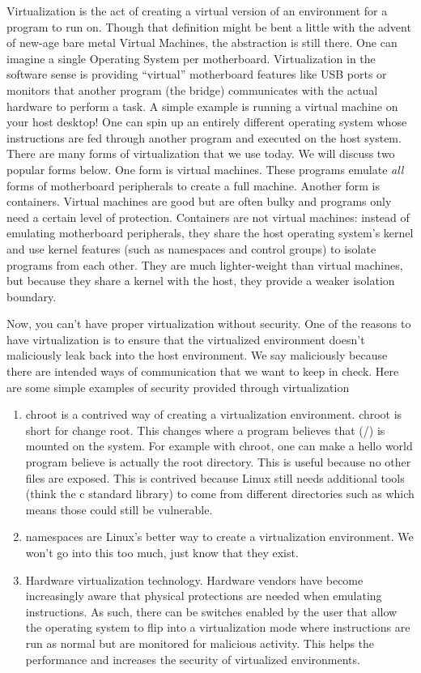 Virtualization is the act of creating a virtual version of an environment for a program to run on.
Though that definition might be bent a little with the advent of new-age bare metal Virtual Machines, the abstraction is still there.
One can imagine a single Operating System per motherboard.
Virtualization in the software sense is providing ``virtual'' motherboard features like USB ports or monitors that another program (the bridge) communicates with the actual hardware to perform a task.
A simple example is running a virtual machine on your host desktop!
One can spin up an entirely different operating system whose instructions are fed through another program and executed on the host system.
There are many forms of virtualization that we use today. We will discuss two popular forms below.
One form is virtual machines.
These programs emulate \textit{all} forms of motherboard peripherals to create a full machine.
Another form is containers.
Virtual machines are good but are often bulky and programs only need a certain level of protection.
Containers are not virtual machines: instead of emulating motherboard peripherals, they share the host operating system's kernel and use kernel features (such as namespaces and control groups) to isolate programs from each other. They are much lighter-weight than virtual machines, but because they share a kernel with the host, they provide a weaker isolation boundary.

Now, you can't have proper virtualization without security.
One of the reasons to have virtualization is to ensure that the virtualized environment doesn't maliciously leak back into the host environment.
We say maliciously because there are intended ways of communication that we want to keep in check.
Here are some simple examples of security provided through virtualization

\begin{enumerate}
\item chroot is a contrived way of creating a virtualization environment.
  chroot is short for change root.
  This changes where a program believes that (/) is mounted on the system.
  For example with chroot, one can make a hello world program believe  is actually the root directory.
  This is useful because no other files are exposed.
  This is contrived because Linux still needs additional tools (think the c standard library) to come from different directories such as  which means those could still be vulnerable.
\item namespaces are Linux's better way to create a virtualization environment.
  We won't go into this too much, just know that they exist.
\item Hardware virtualization technology.
  Hardware vendors have become increasingly aware that physical protections are needed when emulating instructions.
  As such, there can be switches enabled by the user that allow the operating system to flip into a virtualization mode where instructions are run as normal but are monitored for malicious activity.
  This helps the performance and increases the security of virtualized environments.
\end{enumerate}

